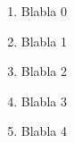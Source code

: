 \documentclass[a4paper,11pt]{article}
\begin{document}
\begin{enumerate}
\item Blabla 0
\item Blabla 1
\item Blabla 2
\item Blabla 3
\item Blabla 4

\end{enumerate}
\end{document}
